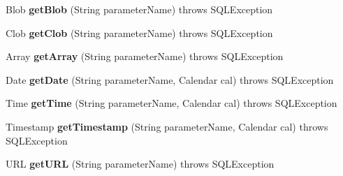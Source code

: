 \begin{DoxyCompactItemize}
Blob {\bfseries get\+Blob} (String parameter\+Name)  throws S\+Q\+L\+Exception 
\item 
\mbox{\label{classcom_1_1mysql_1_1jdbc_1_1jdbc2_1_1optional_1_1_callable_statement_wrapper_ab567bb28362716ea380eefd98450caef}} 
Clob {\bfseries get\+Clob} (String parameter\+Name)  throws S\+Q\+L\+Exception 
\item 
\mbox{\label{classcom_1_1mysql_1_1jdbc_1_1jdbc2_1_1optional_1_1_callable_statement_wrapper_a8eba671f7b5faa51de4114e7cc6872d7}} 
Array {\bfseries get\+Array} (String parameter\+Name)  throws S\+Q\+L\+Exception 
\item 
\mbox{\label{classcom_1_1mysql_1_1jdbc_1_1jdbc2_1_1optional_1_1_callable_statement_wrapper_ad3e1c2806168a9c811c03590f7f66c61}} 
Date {\bfseries get\+Date} (String parameter\+Name, Calendar cal)  throws S\+Q\+L\+Exception 
\item 
\mbox{\label{classcom_1_1mysql_1_1jdbc_1_1jdbc2_1_1optional_1_1_callable_statement_wrapper_a61d9373990933a4bab07f370aec85c82}} 
Time {\bfseries get\+Time} (String parameter\+Name, Calendar cal)  throws S\+Q\+L\+Exception 
\item 
\mbox{\label{classcom_1_1mysql_1_1jdbc_1_1jdbc2_1_1optional_1_1_callable_statement_wrapper_ad7e94504afdaecd91bfeae0ce9912037}} 
Timestamp {\bfseries get\+Timestamp} (String parameter\+Name, Calendar cal)  throws S\+Q\+L\+Exception 
\item 
\mbox{\label{classcom_1_1mysql_1_1jdbc_1_1jdbc2_1_1optional_1_1_callable_statement_wrapper_a5442037069f56ded64cd532c6308f274}} 
U\+RL {\bfseries get\+U\+RL} (String parameter\+Name)  throws S\+Q\+L\+Exception 
\end{DoxyCompactItemize}
